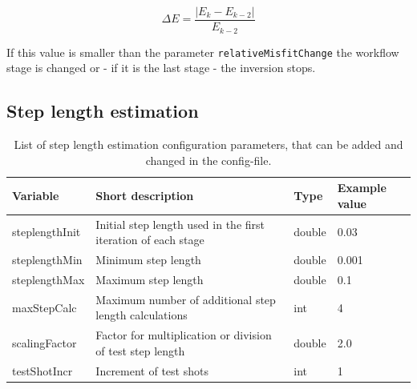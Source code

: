 \documentclass[pdftex,a4paper,parskip,listof=totoc,bibliography=totoc,onehalfspacing,12pt]{scrreprt}
\begin{document}
\begin{equation*}
 \Delta E = \frac{|E_k-E_{k-2}|}{E_{k-2}}
\end{equation*}

If this value is smaller than the parameter \verb+relativeMisfitChange+ the workflow stage is changed or - if it is the last stage - the inversion stops.

\subsection{Step length estimation}

\begin{table}[h!]
\caption[List of step length estimation configuration parameters.]{List of step length estimation configuration parameters, that can be added and changed in the config-file.}\label{tab:config_steplength}
\centering
\begin{adjustbox}{width=1\textwidth,center=\textwidth}
	\begin{tabular}{llll}
	\toprule
         Variable                 & Short description                                                   & Type   & Example value \\
	\midrule
         steplengthInit           & Initial step length used in the first iteration of each stage       & double & 0.03  \\
         steplengthMin            & Minimum step length                                                 & double & 0.001 \\
         steplengthMax            & Maximum step length                                                 & double & 0.1 \\                     
         maxStepCalc              & Maximum number of additional step length calculations               &  int   & 4 \\                         
         scalingFactor            & Factor for multiplication or division of test step length           & double & 2.0 \\                                            
         testShotIncr             & Increment of test shots                                             &  int   & 1 \\                       
	\bottomrule
	\end{tabular}
	\end{adjustbox}
\end{table}
\end{document}
